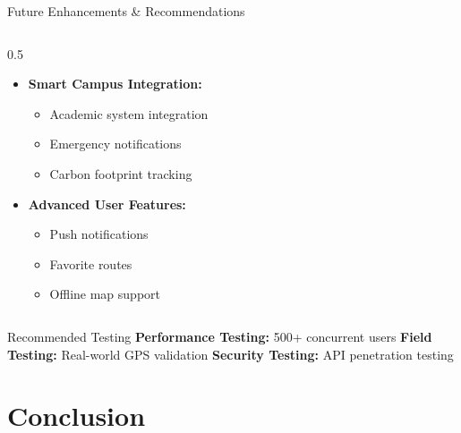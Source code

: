 \documentclass[aspectratio=169]{beamer}
\begin{document}
\begin{frame}{Future Enhancements \& Recommendations}
\begin{columns}
\begin{column}{0.5\textwidth}
\begin{itemize}
\begin{itemize}
                        \item Historical data analysis
                        \item Demand forecasting
                    \end{itemize}
                \item \textbf{Smart Campus Integration:}
                    \begin{itemize}
                        \item Academic system integration
                        \item Emergency notifications
                        \item Carbon footprint tracking
                    \end{itemize}
                \item \textbf{Advanced User Features:}
                    \begin{itemize}
                        \item Push notifications
                        \item Favorite routes
                        \item Offline map support
                    \end{itemize}
            \end{itemize}
        \end{column}
    \end{columns}
    
    \vspace{0.3cm}
    \begin{block}{Recommended Testing}
        \textbf{Performance Testing:} 500+ concurrent users \quad
        \textbf{Field Testing:} Real-world GPS validation \quad
        \textbf{Security Testing:} API penetration testing
    \end{block}
\end{frame}

\section{Conclusion}
\end{document}
